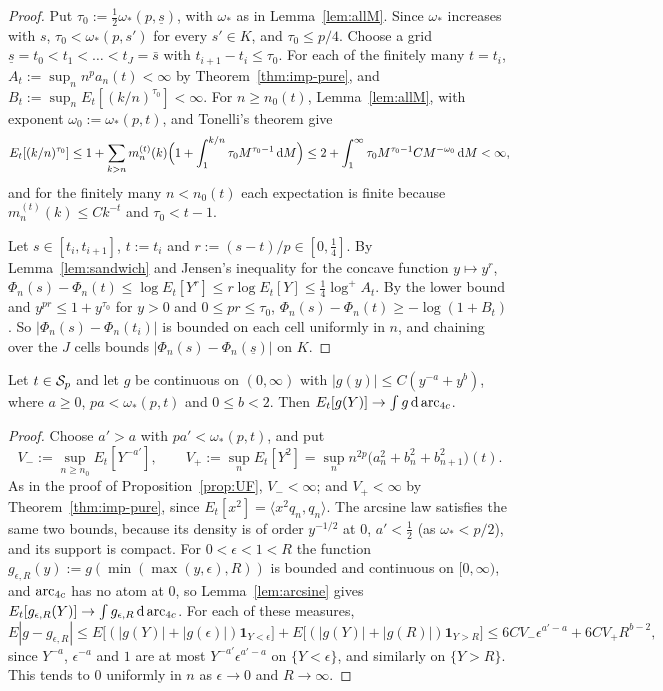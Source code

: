 \begin{proof}
Put $\tau_0:=\frac12\omega_*(p,\underline s)$, with $\omega_*$ as in Lemma~\ref{lem:allM}. Since $\omega_*$
increases with $s$, $\tau_0<\omega_*(p,s')$ for every $s'\in K$, and $\tau_0\le p/4$. Choose a grid $\underline s=t_0<t_1<\dots<t_J=\bar s$ with
$t_{i+1}-t_i\le \tau_0$. For each of the finitely many $t=t_i$, $A_t:=\sup_nn^pa_n(t)<\infty$ by
Theorem~\ref{thm:imp-pure}, and $B_t:=\sup_nE_t[(k/n)^{\tau_0}]<\infty$. For $n\ge n_0(t)$,
Lemma~\ref{lem:allM}, with exponent $\omega_0:=\omega_*(p,t)$, and Tonelli's theorem give
\[
  E_t[(k/n)^{\tau_0}]\le1+\sum_{k>n}m^{(t)}_n(k)\Bigl(1+\int_1^{k/n}\tau_0M^{\tau_0-1}\,\mathrm{d} M\Bigr)
  \le2+\int_1^\infty \tau_0M^{\tau_0-1}CM^{-\omega_0}\,\mathrm{d} M<\infty,
\]
and for the finitely many $n<n_0(t)$ each expectation is finite because $m^{(t)}_n(k)\le Ck^{-t}$ and $\tau_0<t-1$.

Let $s\in[t_i,t_{i+1}]$, $t:=t_i$ and $r:=(s-t)/p\in[0,\frac14]$. By Lemma~\ref{lem:sandwich} and Jensen's inequality
for the concave function $y\mapsto y^r$, $\Phi_n(s)-\Phi_n(t)\le\log E_t[Y^r]\le r\log E_t[Y]\le\frac14\log^+A_t$. By the
lower bound and $y^{pr}\le1+y^{\tau_0}$ for $y>0$ and $0\le pr\le \tau_0$, $\Phi_n(s)-\Phi_n(t)\ge-\log(1+B_t)$. So
$|\Phi_n(s)-\Phi_n(t_i)|$ is bounded on each cell uniformly in $n$, and chaining over the $J$ cells bounds
$|\Phi_n(s)-\Phi_n(\underline s)|$ on $K$.
\end{proof}

\begin{lemma}\label{lem:W}
Let $t\in\mathcal{S}_p$ and let $g$ be continuous on $(0,\infty)$ with $|g(y)|\le C(y^{-a}+y^{b})$, where $a\ge0$,
$pa<\omega_*(p,t)$ and $0\le b<2$. Then $E_t[g(Y)]\to\int g\,\mathrm{d}\operatorname{arc}_{4c}$.
\end{lemma}

\begin{proof}
Choose $a'>a$ with $pa'<\omega_*(p,t)$, and put
\[
  V_-:=\sup_{n\ge n_0}E_t[Y^{-a'}],\qquad V_+:=\sup_nE_t[Y^2]=\sup_nn^{2p}\bigl(a_n^2+b_n^2+b_{n+1}^2\bigr)(t).
\]
As in the proof of Proposition~\ref{prop:UF}, $V_-<\infty$; and $V_+<\infty$ by Theorem~\ref{thm:imp-pure}, since
$E_t[x^2]=\langle x^2q_n,q_n\rangle$. The arcsine law satisfies the same two bounds, because its density is of order
$y^{-1/2}$ at $0$, $a'<\frac12$ (as $\omega_*<p/2$), and its support is compact. For $0<\epsilon<1<R$ the function
$g_{\epsilon,R}(y):=g(\min(\max(y,\epsilon),R))$ is bounded and continuous on $[0,\infty)$, and $\operatorname{arc}_{4c}$ has no atom at
$0$, so Lemma~\ref{lem:arcsine} gives $E_t[g_{\epsilon,R}(Y)]\to\int g_{\epsilon,R}\,\mathrm{d}\operatorname{arc}_{4c}$. For each of these
measures,
\[
  E|g-g_{\epsilon,R}|\le E\bigl[(|g(Y)|+|g(\epsilon)|)\mathbf 1_{Y<\epsilon}\bigr]+E\bigl[(|g(Y)|+|g(R)|)\mathbf 1_{Y>R}\bigr]
  \le6CV_-\epsilon^{a'-a}+6CV_+R^{b-2},
\]
since $Y^{-a}$, $\epsilon^{-a}$ and $1$ are at most $Y^{-a'}\epsilon^{a'-a}$ on $\{Y<\epsilon\}$, and similarly on
$\{Y>R\}$. This tends to $0$ uniformly in $n$ as $\epsilon\to0$ and $R\to\infty$.
\end{proof}

